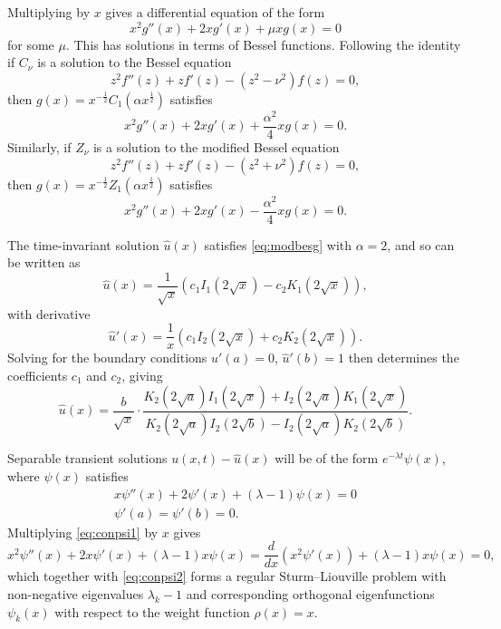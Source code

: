 \documentclass[parskip=half]{scrartcl}
\theoremstyle{nonumberplain}
\begin{document}
Multiplying by $x$ gives a differential equation of the form
\begin{equation}
    \label{eq:conicmu}
    x^2 g''(x) + 2x g'(x) + \mu x g(x) = 0
\end{equation}
for some $\mu$. This has solutions in terms of Bessel functions.
Following the identity if $C_\nu$
is a solution to the Bessel equation
\begin{equation}
    z^2 f''(z) + z f'(z) - (z^2 - \nu^2) f(z) = 0,
\end{equation}
then $g(x) = x^{-\frac{1}{2}}C_1(\alpha x^\frac{1}{2})$ satisfies
\begin{equation}
    \label{eq:besg}
    x^2 g''(x) + 2x g'(x) + \frac{\alpha^2}{4} x g(x) = 0.
\end{equation}
Similarly, if $Z_\nu$ is a solution to the modified Bessel equation
\begin{equation}
    z^2 f''(z) + z f'(z) - (z^2 + \nu^2) f(z) = 0,
\end{equation}
then $g(x) = x^{-\frac{1}{2}}Z_1(\alpha x^\frac{1}{2})$ satisfies
\begin{equation}
    \label{eq:modbesg}
    x^2 g''(x) + 2x g'(x) - \frac{\alpha^2}{4} x g(x) = 0.
\end{equation}

The time-invariant solution $\hat u(x)$ satisfies \eqref{eq:modbesg} with $\alpha=2$, and so
can be written as
\begin{equation}
    \hat u(x) = \frac{1}{\sqrt{x}} \left(c_1 I_1(2\sqrt{x}) - c_2 K_1(2\sqrt{x})\right),
\end{equation}
with derivative
\begin{equation}
    \hat u'(x) = \frac{1}{x} \left(c_1 I_2(2\sqrt{x}) + c_2 K_2(2\sqrt{x})\right).
\end{equation}
Solving for the boundary conditions $\hat u'(a)=0$, $\hat u'(b)=1$ then determines the coefficients
$c_1$ and $c_2$, giving
\begin{equation}
    \label{eq:conuhat}
    \hat u(x) =
    \frac{b}{\sqrt{x}}\cdot
    \frac{K_2(2\sqrt{a})I_1(2\sqrt{x}) + I_2(2\sqrt{a})K_1(2\sqrt{x})}
    {K_2(2\sqrt{a})I_2(2\sqrt{b})-I_2(2\sqrt{a})K_2(2\sqrt{b})}.
\end{equation}

Separable transient solutions $u(x,t)-\hat u(x)$ will be of the form $e^{-\lambda t}\psi(x)$,
where $\psi(x)$ satisfies
\begin{gather}
    \label{eq:conpsi1}
    x\psi''(x) + 2\psi'(x) + (\lambda-1)\psi(x) = 0\\
    \label{eq:conpsi2}
    \psi'(a) = \psi'(b) = 0.
\end{gather}
Multiplying \eqref{eq:conpsi1} by $x$ gives
\begin{equation}
    \label{eq:conpsils}
    x^2\psi''(x) + 2x\psi'(x) + (\lambda-1)x \psi(x) =
    \frac{d}{dx}(x^2\psi'(x)) + (\lambda-1)x \psi(x) = 0,
\end{equation}
which together with \eqref{eq:conpsi2} forms a regular Sturm--Liouville problem with
non-negative eigenvalues $\lambda_k-1$ and corresponding orthogonal eigenfunctions
$\psi_k(x)$ with respect to the weight function $\rho(x) = x$.
\end{document}
